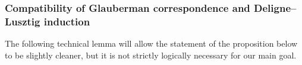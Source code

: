 \documentclass[reqno]{amsart}
\numberwithin{equation}{subsection}
\newcommand{\F}{\mathbf{F}}
\newcommand{\wt}[1]{\widetilde{#1}}
\newcommand{\ol}[1]{\overline{#1}}
\DeclareMathOperator{\Res}{Res}
\theoremstyle{remark}
\numberwithin{equation}{subsection}
\numberwithin{figure}{subsection}
\begin{document}

\subsubsection{Compatibility of Glauberman correspondence and Deligne--Lusztig induction}
The following technical lemma will allow the statement of the proposition below to be slightly cleaner, but it is not strictly logically necessary for our main goal.
\end{document}
